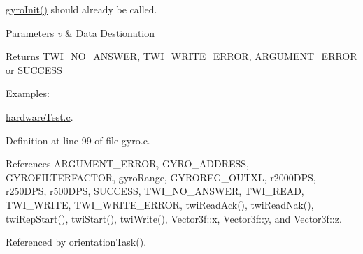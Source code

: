 \hyperlink{group__gyro_ga276b9ab6ac85c65b5a55356c00958be7}{gyro\-Init()} should already be called. 
\begin{DoxyParams}{Parameters}
{\em v} & Data Destionation \\
\hline
\end{DoxyParams}
\begin{DoxyReturn}{Returns}
\hyperlink{group__error_gga2c3e4bb40f36b262a5214e2da2bca9c5a04d5943ba652af2205c88b247e0c659c}{T\-W\-I\-\_\-\-N\-O\-\_\-\-A\-N\-S\-W\-E\-R}, \hyperlink{group__error_gga2c3e4bb40f36b262a5214e2da2bca9c5ac0e3b3463dcaf220e54794b4711708c9}{T\-W\-I\-\_\-\-W\-R\-I\-T\-E\-\_\-\-E\-R\-R\-O\-R}, \hyperlink{group__error_gga2c3e4bb40f36b262a5214e2da2bca9c5a49ccf277a69dd938c591928aa27c66cc}{A\-R\-G\-U\-M\-E\-N\-T\-\_\-\-E\-R\-R\-O\-R} or \hyperlink{group__error_gga2c3e4bb40f36b262a5214e2da2bca9c5ac7f69f7c9e5aea9b8f54cf02870e2bf8}{S\-U\-C\-C\-E\-S\-S} 
\end{DoxyReturn}
\begin{Desc}
\item[Examples\-: ]\par
\hyperlink{hardware_test_8c-example}{hardware\-Test.\-c}.\end{Desc}


Definition at line 99 of file gyro.\-c.



References A\-R\-G\-U\-M\-E\-N\-T\-\_\-\-E\-R\-R\-O\-R, G\-Y\-R\-O\-\_\-\-A\-D\-D\-R\-E\-S\-S, G\-Y\-R\-O\-F\-I\-L\-T\-E\-R\-F\-A\-C\-T\-O\-R, gyro\-Range, G\-Y\-R\-O\-R\-E\-G\-\_\-\-O\-U\-T\-X\-L, r2000\-D\-P\-S, r250\-D\-P\-S, r500\-D\-P\-S, S\-U\-C\-C\-E\-S\-S, T\-W\-I\-\_\-\-N\-O\-\_\-\-A\-N\-S\-W\-E\-R, T\-W\-I\-\_\-\-R\-E\-A\-D, T\-W\-I\-\_\-\-W\-R\-I\-T\-E, T\-W\-I\-\_\-\-W\-R\-I\-T\-E\-\_\-\-E\-R\-R\-O\-R, twi\-Read\-Ack(), twi\-Read\-Nak(), twi\-Rep\-Start(), twi\-Start(), twi\-Write(), Vector3f\-::x, Vector3f\-::y, and Vector3f\-::z.



Referenced by orientation\-Task().


